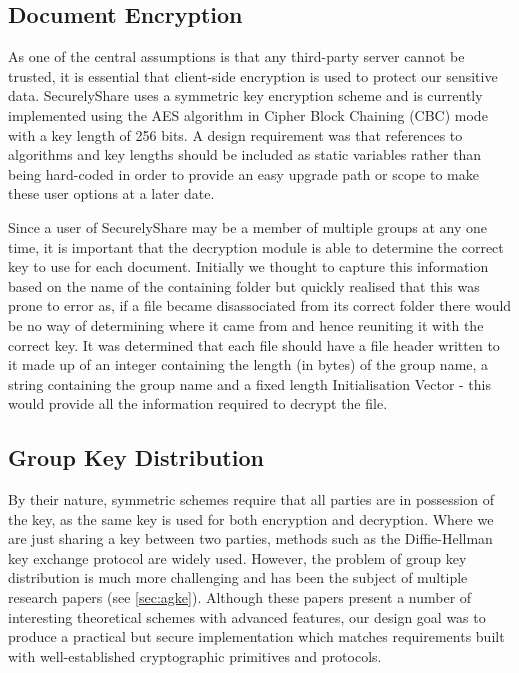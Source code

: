 \subsection*{Document Encryption}
As one of the central assumptions is that any third-party server cannot be trusted, it is essential that client-side encryption is used to protect our sensitive data.  SecurelyShare uses a symmetric key encryption scheme and is currently implemented using the AES algorithm in Cipher Block Chaining (CBC) mode with a key length of 256 bits.  A design requirement was that references to algorithms and key lengths should be included as static variables rather than being hard-coded in order to provide an easy upgrade path or scope to make these user options at a later date.

Since a user of SecurelyShare may be a member of multiple groups at any one time, it is important that the decryption module is able to determine the correct key to use for each document.  Initially we thought to capture this information based on the name of the containing folder but quickly realised that this was prone to error as, if a file became disassociated from its correct folder there would be no way of determining where it came from and hence reuniting it with the correct key.  It was determined that each file should have a file header written to it made up of an integer containing the length (in bytes) of the group name, a string containing the group name and a fixed length Initialisation Vector - this would provide all the information required to decrypt the file.



\subsection*{Group Key Distribution}
By their nature, symmetric  schemes require that all parties are in possession of the key, as the same key is used for both encryption and decryption.  Where we are just sharing a key between two parties, methods such as the Diffie-Hellman key exchange protocol \cite{dh1976}  are widely used.  However, the problem of group key distribution is much more challenging and has been the subject of multiple research papers (see  \ref{sec:agke}).  Although these papers present a number of interesting theoretical schemes with advanced features, our design goal was to produce a practical but secure implementation which matches requirements built with well-established cryptographic primitives and protocols.    

